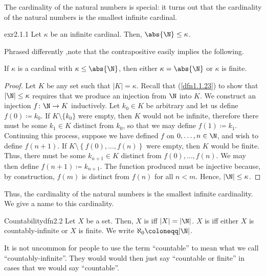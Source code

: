 The cardinality of the natural numbers is special:  it turns out that the cardinality of the natural numbers is the smallest infinite cardinal.
\begin{prp}{}{exr2.1.1}
	Let $\kappa$ be an infinite cardinal.  Then, $\abs{\N}\leq \kappa$.
	\begin{rmk}
		Phrased differently ,note that the contrapositive easily implies the following.
		\begin{important}
			If $\kappa$ is a cardinal with $\kappa \leq \abs{\N}$, then either $\kappa =\abs{\N}$ or $\kappa$ is finite.
		\end{important}
	\end{rmk}
	\begin{proof}
		Let $K$ be any set such that $|K|=\kappa$.  Recall that (\cref{dfn1.1.23}) to show that $|\N |\leq \kappa$ requires that we produce an injection from $\N$ into $K$.  We construct an injection $f\colon \N \rightarrow K$ inductively.  Let $k_0\in K$ be arbitrary and let us define $f(0)\coloneqq k_0$.  If $K\setminus \{ k_0\}$ were empty, then $K$ would not be infinite, therefore there must be some $k_1\in K$ distinct from $k_0$, so that we may define $f(1)\coloneqq k_1$.  Continuing this process, suppose we have defined $f$ on $0,\ldots ,n\in \N$, and wish to define $f(n+1)$.  If $K\setminus \left\{ f(0),\ldots ,f(n)\right\}$ were empty, then $K$ would be finite.  Thus, there must be some $k_{n+1}\in K$ distinct from $f(0),\ldots ,f(n)$.  We may then define $f(n+1)\coloneqq k_{n+1}$.  The function produced must be injective because, by construction, $f(m)$ is distinct from $f(n)$ for all $n<m$.  Hence, $|\N |\leq \kappa$.
	\end{proof}
\end{prp}
Thus, the cardinality of the natural numbers is the smallest infinite cardinality.  We give a name to this cardinality.
\begin{dfn}{Countability}{dfn2.2}
	Let $X$ be a set.  Then, $X$ is  iff $|X|=|\N |$.  $X$ is  iff either $X$ is countably-infinite or $X$ is finite.  We write $\aleph _0\coloneqq |\N |$\index[notation]{$\aleph _0$}.
	\begin{rmk}
		It is not uncommon for people to use the term ``countable'' to mean what we call ``countably-infinite''.  They would would then just say ``countable or finite'' in cases that we would say ``countable''.
	\end{rmk}
\end{dfn}

